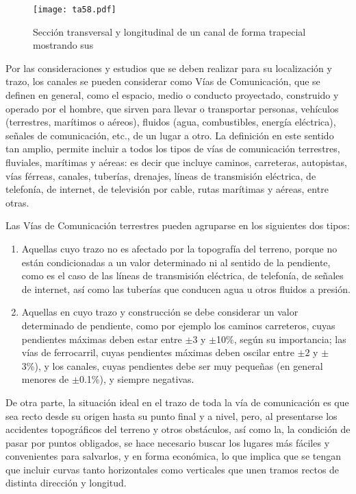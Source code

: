 \begin{figure}[h!]
\centering
  \texttt{[image: ta58.pdf]}
  \caption{Sección transversal y longitudinal de un canal de forma trapecial mostrando sus }
  \label{ta58}
\end{figure}

Por las consideraciones y estudios que se deben realizar para su localización y trazo, los canales se pueden considerar como Vías de Comunicación, que se definen en general, como el espacio, medio o conducto proyectado, construido y operado por el hombre, que sirven para llevar o transportar personas, vehículos (terrestres, marítimos o aéreos), fluidos (agua, combustibles, energía eléctrica), señales de comunicación, etc., de un lugar a otro. La definición en este sentido tan amplio, permite incluir a todos los tipos de vías de comunicación terrestres, fluviales, marítimas y aéreas: es decir que incluye caminos, carreteras, autopistas, vías férreas, canales, tuberías, drenajes, líneas de transmisión eléctrica, de telefonía, de internet, de televisión por cable, rutas marítimas y aéreas, entre otras.

Las Vías de Comunicación terrestres pueden agruparse en los siguientes dos tipos:
\begin{enumerate}
    \item Aquellas cuyo trazo no es afectado por la topografía del terreno, porque no están condicionadas a un valor determinado ni al sentido de la pendiente, como es el caso
    de las líneas de transmisión eléctrica, de telefonía, de señales de internet, así como las tuberías que conducen agua u otros fluidos a presión.
    \item Aquellas en cuyo trazo y construcción se debe considerar un valor determinado de pendiente, como por ejemplo los caminos carreteros, cuyas pendientes máximas deben estar entre $\pm$3 y $\pm$10\%, según su importancia; las vías de ferrocarril, cuyas pendientes máximas deben oscilar entre $\pm$2 y $\pm$ 3\%), y los canales, cuyas pendientes debe ser muy pequeñas (en general menores de $\pm$0.1\%), y siempre negativas.
\end{enumerate}

De otra parte, la situación ideal en el trazo de toda la vía de comunicación es que sea recto
desde su origen hasta su punto final y a nivel, pero, al presentarse los accidentes topográficos del terreno y otros obstáculos, así como la, la condición de pasar por puntos obligados, se hace necesario buscar los lugares más fáciles y convenientes para salvarlos, y en forma económica, lo que implica que se tengan que incluir curvas tanto horizontales como verticales que unen tramos rectos de distinta dirección y longitud.


